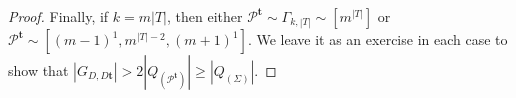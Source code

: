 \documentclass[10pt,a4paper]{amsart}
\newcommand{\geqs}{\geqslant}
\newcommand{\minPart}{\Gamma_{k, |T|}}
\begin{document}
\begin{proof}
	Finally, if $k = m|T|$, then either $\mathcal{P}^{\mathbf{t}}\sim \minPart \sim [m^{|T|}]$ or $\mathcal{P}^{\mathbf{t}}\sim [(m-1)^1,m^{|T|-2},(m+1)^1]$. We leave it as an exercise in each case to show that $|G_{D,D\mathbf{t}}| > 2|Q_{(\mathcal{P}^{\mathbf{t}})}| \geqs |Q_{(\Sigma)}|$.
\end{proof}
\end{document}
